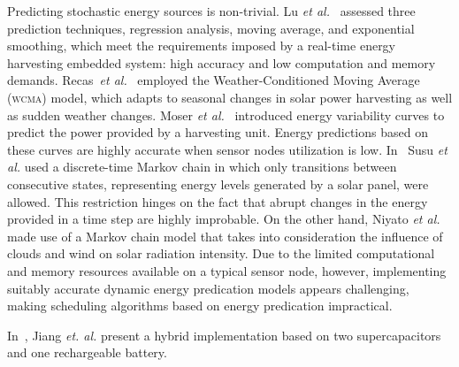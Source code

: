 Predicting stochastic energy sources is non-trivial.  
Lu \emph{et al.}~\cite{lu2010accurate} assessed three prediction techniques, regression analysis,
moving average, and exponential smoothing, which meet the requirements imposed by a real-time energy
harvesting embedded system: high accuracy and low computation and memory demands. 
Recas~\emph{et al.}~\cite{recas2000hollows} employed the Weather-Conditioned Moving Average (\textsc{wcma}) model,
which adapts to seasonal changes in solar power harvesting as well as sudden weather changes. 
Moser \emph{et al.}~\cite{moser2007real} introduced energy variability curves to predict the power provided by a 
harvesting unit. Energy predictions based on these curves are highly accurate when sensor nodes utilization is low.
In~\cite{susu2008stochastic} Susu \emph{et al.} used a discrete-time Markov chain in which only transitions between 
consecutive states, representing energy levels generated by a solar panel, were allowed. This restriction hinges
on the fact that abrupt changes in the energy provided in a time step are highly improbable. 
On the other hand, Niyato \emph{et al.}~\cite{niyato2007sleep} made use of a Markov chain model that takes into
consideration the influence of clouds and wind on solar radiation intensity. 
Due to the limited computational and memory resources available on a typical sensor node, however,
implementing suitably accurate dynamic energy predication models appears challenging, making 
scheduling algorithms based on energy predication impractical. 

In~\cite{jiang2005perpetual}, Jiang \emph{et. al.} present a hybrid implementation based on two supercapacitors and one rechargeable battery.

